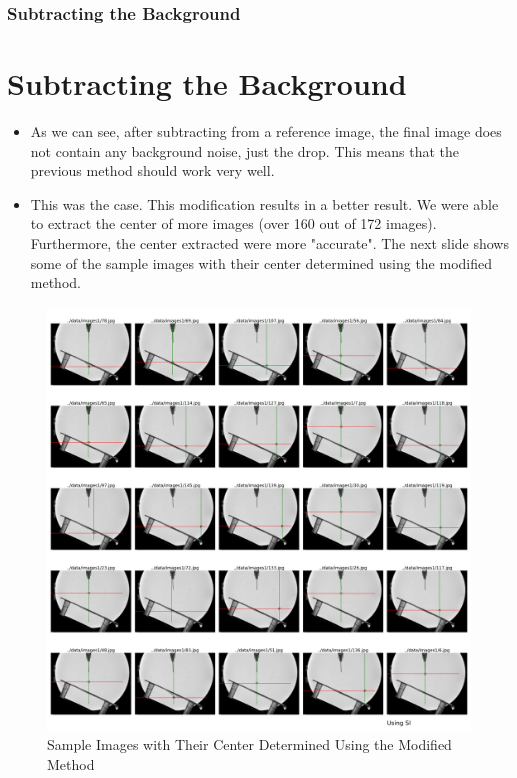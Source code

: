 \documentclass{beamer}
\begin{document}
\begin{frame}
    \frametitle{Subtracting the Background}
    \section{Subtracting the Background}
    \begin{itemize}
        \item <1->  As we can see, after subtracting from a reference image, the final image does not contain any background noise, just the drop. This means that the previous method should work very well.
        \item <2-> This was the case. This modification results in a better result. We were able to extract the center of more images (over 160 out of 172 images). Furthermore, the center extracted were more "accurate". The next slide shows some of the sample images with their center determined using the modified method.
    \end{itemize}
\end{frame}
\begin{frame}
    \begin{figure}
        \centering
        \includegraphics[scale=0.10]{using_si.png}
        \caption{Sample Images with Their Center Determined Using the Modified Method}
    \end{figure}
\end{frame}
\end{document}
